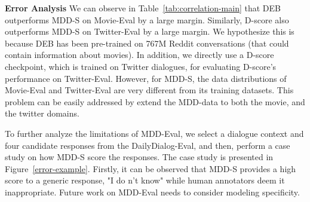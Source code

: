 \documentclass[letterpaper]{article} \usepackage{aaai22}  \usepackage{times}  \usepackage{helvet}  \usepackage{courier}  \usepackage[hyphens]{url}  \usepackage{graphicx} \urlstyle{rm} \def\UrlFont{\rm}  \usepackage{natbib}  \usepackage{caption} \DeclareCaptionStyle{ruled}{labelfont=normalfont,labelsep=colon,strut=off} \frenchspacing  \setlength{\pdfpagewidth}{8.5in}  \setlength{\pdfpageheight}{11in}  \usepackage{algorithm}
\begin{document}
\begin{table}[!t]
\centering
{}
\caption{Spearman correlation scores of USR, USL-H, and GRADE trained on the combined dataset.}
\label{tab:combined-correlation}
\end{table}


\bigskip
\noindent\textbf{Error Analysis } We can observe in Table~\ref{tab:correlation-main} that DEB outperforms MDD-S on Movie-Eval by a large margin. Similarly, D-score also outperforms MDD-S on Twitter-Eval by a large margin. We hypothesize this is because DEB has been pre-trained on 767M Reddit conversations (that could contain information about movies). In addition, we directly use a D-score checkpoint, which is trained on Twitter dialogues, for evaluating D-score's performance on Twitter-Eval. However, for MDD-S, the data distributions of Movie-Eval and Twitter-Eval are very different from its training datasets. This problem can be easily addressed by extend the MDD-data to both the movie, and the twitter domains.

To further analyze the limitations of MDD-Eval, we select a dialogue context and four candidate responses from the DailyDialog-Eval, and then, perform a case study on how MDD-S score the responses. The case study is presented in Figure~\ref{error-example}. Firstly, it can be observed that MDD-S provides a high score to a generic response, "I do n't know" while human annotators deem it inappropriate. Future work on MDD-Eval needs to consider modeling specificity. 
\end{document}
